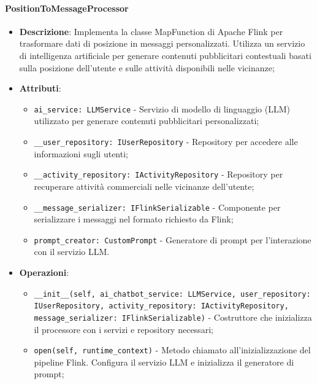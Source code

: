 \documentclass[10pt]{article}
\begin{document}
    \paragraph{PositionToMessageProcessor}
    \begin{itemize} 
    \item \textbf{Descrizione}: Implementa la classe MapFunction di Apache Flink per trasformare dati di posizione in messaggi personalizzati. Utilizza un servizio di intelligenza artificiale per generare contenuti pubblicitari contestuali basati sulla posizione dell'utente e sulle attività disponibili nelle vicinanze;
    \item \textbf{Attributi}:
    \begin{itemize}
        \item \texttt{ai\_service: LLMService} - Servizio di modello di linguaggio (LLM) utilizzato per generare contenuti pubblicitari personalizzati;
        \item \texttt{\_\_user\_repository: IUserRepository} - Repository per accedere alle informazioni sugli utenti;
        \item \texttt{\_\_activity\_repository: IActivityRepository} - Repository per recuperare attività commerciali nelle vicinanze dell'utente;
        \item \texttt{\_\_message\_serializer: IFlinkSerializable} - Componente per serializzare i messaggi nel formato richiesto da Flink;
        \item \texttt{prompt\_creator: CustomPrompt} - Generatore di prompt per l'interazione con il servizio LLM.
    \end{itemize}
    
    \item \textbf{Operazioni}:
    \begin{itemize}
        \item \texttt{\_\_init\_\_(self, ai\_chatbot\_service: LLMService, user\_repository: IUserRepository, activity\_repository: IActivityRepository, message\_serializer: IFlinkSerializable)} - Costruttore che inizializza il processore con i servizi e repository necessari;
        
        \item \texttt{open(self, runtime\_context)} - Metodo chiamato all'inizializzazione del pipeline Flink. Configura il servizio LLM e inizializza il generatore di prompt;
        

\end{itemize}
\end{itemize}
\end{document}
